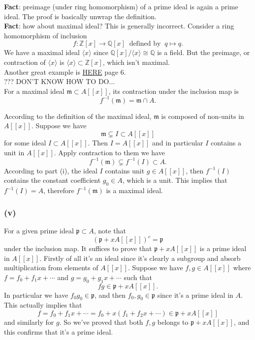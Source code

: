 \textbf{Fact}: preimage (under ring homomorphism) of a prime ideal is again a prime ideal.
The proof is basically unwrap the definition.\\

\textbf{Fact}: how about maximal ideal? This is generally incorrect.
Consider a ring homomorphism of inclusion 
$$f:\mathbb Z[x]\to \mathbb Q[x] ~\text{  defined  by  }~ q\mapsto q.$$ 
We have a maximal ideal $\langle x\rangle$ since $\mathbb Q[x]/\langle x\rangle \cong \mathbb Q$ is a field. But the preimage, or contraction of $\langle x\rangle$ is $\langle x\rangle \subset \mathbb Z[x]$, which isn't maximal.\\
Another great example is \href{https://www.dpmms.cam.ac.uk/~sjw47/Lecture1-3.pdf}{HERE} page 6.\\

??? DON'T KNOW HOW TO DO...\\

For a maximal ideal $\mathfrak m\subset A[[x]]$, its contraction under the inclusion map is 
$$f^{-1}(\mathfrak m)=\mathfrak m\cap A.$$

According to the definition of the maximal ideal, $\mathfrak m$ is composed of non-units in $A[[x]]$. Suppose we have 
$$\mathfrak m\subsetneq I\subset  A[[x]]$$ for some ideal $I\subset A[[x]]$. Then $I=A[[x]]$ and in particular $I$ contains a unit in $A[[x]]$. Apply contraction to them we have 
$$f^{-1}(\mathfrak m)\subsetneq f^{-1}(I)\subset A.$$ According to part (i), the ideal $I$ contains unit $g\in A[[x]]$, then $f^{-1}(I)$ contains the constant coefficient $g_0\in A$, which is a unit. This implies that $f^{-1}(I)=A$, therefore $f^{-1}(\mathfrak m)$ is a maximal ideal. 



\subsubsection{(v)} 

For a given prime ideal $\mathfrak p\subset A$, note that 
$$(\mathfrak p+xA[[x]])^c=\mathfrak p$$ under the inclusion map. It suffices to prove that $\mathfrak p+xA[[x]]$ is a prime ideal in $A[[x]]$. Firstly of all it's an ideal since it's clearly a subgroup and absorb multiplication from elements of $A[[x]]$. Suppose we have $f,g\in A[[x]]$ where $f=f_0+f_1x+\cdots$ and $g=g_0+g_1x+\cdots$ such that 
$$fg\in \mathfrak p+xA[[x]].$$
In particular we have $f_0g_0\in \mathfrak p$, and then $f_0,g_0\in \mathfrak p$ since it's a prime ideal in $A$. This actually implies that 
$$f=f_0+f_1x+\cdots=f_0+x(f_1+f_2x+\cdots)\in \mathfrak p+xA[[x]]$$ and similarly for $g$. So we've proved that both $f,g$ belongs to $\mathfrak p+xA[[x]]$, and this confirms that it's a prime ideal.




